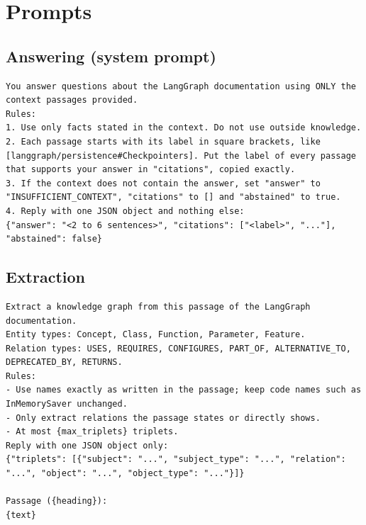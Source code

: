 \documentclass[11pt,a4paper]{article}
\begin{document}
\section{Prompts}
\label{app:prompts}

\subsection*{Answering (system prompt)}
\begin{lstlisting}
You answer questions about the LangGraph documentation using ONLY the context passages provided.
Rules:
1. Use only facts stated in the context. Do not use outside knowledge.
2. Each passage starts with its label in square brackets, like [langgraph/persistence#Checkpointers]. Put the label of every passage that supports your answer in "citations", copied exactly.
3. If the context does not contain the answer, set "answer" to "INSUFFICIENT_CONTEXT", "citations" to [] and "abstained" to true.
4. Reply with one JSON object and nothing else:
{"answer": "<2 to 6 sentences>", "citations": ["<label>", "..."], "abstained": false}
\end{lstlisting}

\subsection*{Extraction}
\begin{lstlisting}
Extract a knowledge graph from this passage of the LangGraph documentation.
Entity types: Concept, Class, Function, Parameter, Feature.
Relation types: USES, REQUIRES, CONFIGURES, PART_OF, ALTERNATIVE_TO, DEPRECATED_BY, RETURNS.
Rules:
- Use names exactly as written in the passage; keep code names such as InMemorySaver unchanged.
- Only extract relations the passage states or directly shows.
- At most {max_triplets} triplets.
Reply with one JSON object only:
{"triplets": [{"subject": "...", "subject_type": "...", "relation": "...", "object": "...", "object_type": "..."}]}

Passage ({heading}):
{text}
\end{lstlisting}
\end{document}
